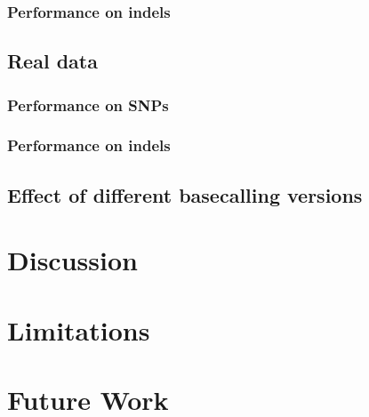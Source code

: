 \subsubsection{Performance on indels}

\subsection{Real data}

\subsubsection{Performance on SNPs}

\subsubsection{Performance on indels}

\subsection{Effect of different basecalling versions}

\section{Discussion}

\section{Limitations}

\section{Future Work}
